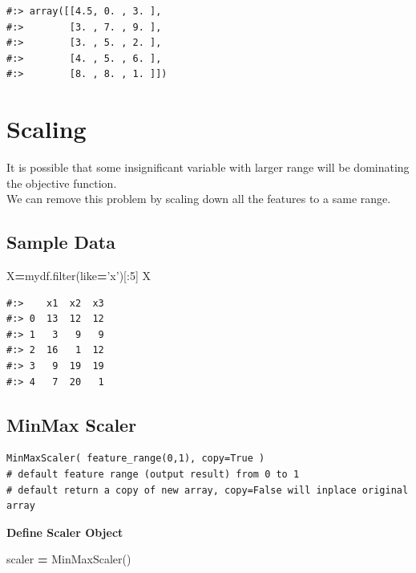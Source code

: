 \documentclass[
]{book}
\newenvironment{Shaded}{\begin{snugshade}}{\end{snugshade}}
\newcommand{\BuiltInTok}[1]{#1}
\newcommand{\DecValTok}[1]{\textcolor[rgb]{0.06,0.06,0.06}{#1}}
\newcommand{\NormalTok}[1]{#1}
\newcommand{\OperatorTok}[1]{\textcolor[rgb]{0.43,0.43,0.43}{\textbf{#1}}}
\newcommand{\StringTok}[1]{\textcolor[rgb]{0.5,0.5,0.5}{#1}}
\begin{document}
\begin{verbatim}
#:> array([[4.5, 0. , 3. ],
#:>        [3. , 7. , 9. ],
#:>        [3. , 5. , 2. ],
#:>        [4. , 5. , 6. ],
#:>        [8. , 8. , 1. ]])
\end{verbatim}

\hypertarget{scaling}{%
\section{Scaling}\label{scaling}}

It is possible that some insignificant variable with larger range will be dominating the objective function.\\
We can remove this problem by scaling down all the features to a same range.

\hypertarget{sample-data-24}{%
\subsection{Sample Data}\label{sample-data-24}}

\begin{Shaded}
\begin{Highlighting}[]
\NormalTok{X}\OperatorTok{=}\NormalTok{mydf.}\BuiltInTok{filter}\NormalTok{(like}\OperatorTok{=}\StringTok{'x'}\NormalTok{)[:}\DecValTok{5}\NormalTok{]}
\NormalTok{X}
\end{Highlighting}
\end{Shaded}

\begin{verbatim}
#:>    x1  x2  x3
#:> 0  13  12  12
#:> 1   3   9   9
#:> 2  16   1  12
#:> 3   9  19  19
#:> 4   7  20   1
\end{verbatim}

\hypertarget{minmax-scaler}{%
\subsection{MinMax Scaler}\label{minmax-scaler}}

\begin{verbatim}
MinMaxScaler( feature_range(0,1), copy=True )
# default feature range (output result) from 0 to 1
# default return a copy of new array, copy=False will inplace original array
\end{verbatim}

\textbf{Define Scaler Object}

\begin{Shaded}
\begin{Highlighting}[]
\NormalTok{scaler }\OperatorTok{=}\NormalTok{ MinMaxScaler()}
\end{Highlighting}
\end{Shaded}
\end{document}
